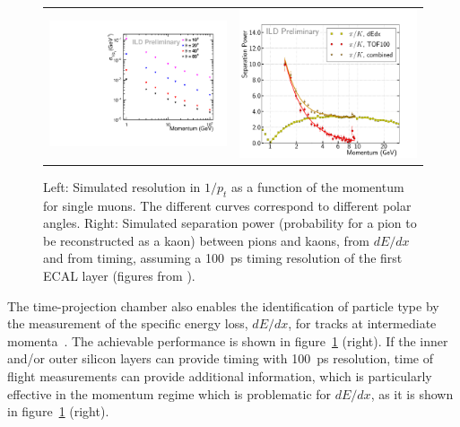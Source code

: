 \documentclass[%
 amsmath,amssymb,
 aps,
 longbibliography,
]{revtex4-1}
\begin{document}
\begin{figure}
    \centering
    \begin{tabular}{m{0.45\hsize}m{0.55\hsize}}
    \includegraphics[width=.9\hsize]{figures/PResolution_ILD_l5_v02.pdf} &
        \includegraphics[width=.82\hsize]{figures/Special_Combined_dEdx_TOF100.pdf}
    \end{tabular}
    \caption{ Left: Simulated resolution in $1/p_t$ as a function of the momentum for single muons. The different curves correspond to different polar angles. Right: Simulated separation power (probability for a pion to be reconstructed as a kaon) between pions and kaons, from $dE/dx$ and from timing, assuming a 100~ps timing resolution of the first ECAL layer (figures from \cite{LCWS2018}).}
    \label{fig:momentumvsp}
\end{figure}

The time-projection chamber also enables the identification of particle type by the measurement of the specific energy loss, $dE/dx$, for tracks at intermediate momenta~\cite{Hauschild:2000eg}. The achievable performance is shown in figure~\ref{fig:momentumvsp} (right). If the inner and/or outer silicon layers can provide timing with 100~ps resolution, time of flight measurements can provide additional information, which is particularly effective in the momentum regime which is problematic for $dE/dx$, as it is shown in figure~\ref{fig:momentumvsp} (right). 
\end{document}
